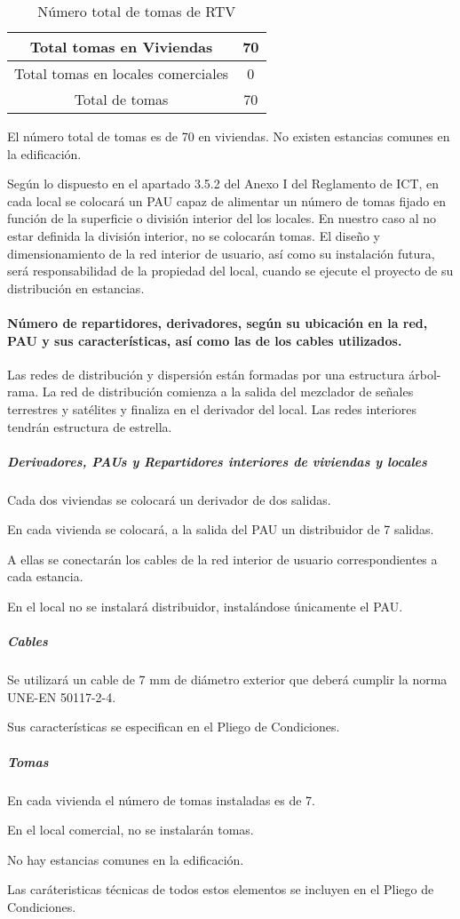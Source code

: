 \begin{table}[H]
\caption{Número total de tomas de RTV}
\label{tomasRTVtotal}
\begin{center}
\begin{tabular}{|c|c|}
\hline
    Total tomas en Viviendas & 70\\
\hline 
    Total tomas en locales comerciales & 0\\
\hline
    Total de tomas & 70	\\
\hline
\end{tabular}
\end{center}
\end{table}

El número total de tomas es de 70 en viviendas. No existen estancias comunes en la edificación.

Según lo dispuesto en el apartado 3.5.2 del Anexo I del Reglamento de ICT, en cada local se colocará un PAU capaz de alimentar un número de tomas fijado en función de la superficie o división interior del los locales. En nuestro caso al no estar definida la división interior, no se colocarán tomas. El diseño y dimensionamiento de la red interior de usuario, así como su instalación futura, será responsabilidad de la propiedad del local, cuando se ejecute el proyecto de su distribución en estancias.

\paragraph{Número de repartidores, derivadores, según su ubicación en la red, PAU y sus características, así como las de los cables utilizados.}

Las redes de distribución y dispersión están formadas por una estructura árbol-rama.
La red de distribución comienza a la salida del mezclador de señales terrestres y satélites y finaliza en el derivador del local.
Las redes interiores tendrán estructura de estrella.


\subparagraph*{Derivadores, PAUs y Repartidores interiores de viviendas y locales}

Cada dos viviendas se colocará un derivador de dos salidas.

En cada vivienda se colocará, a la salida del PAU un distribuidor de 7 salidas. 

A ellas se conectarán los cables de la red interior de usuario correspondientes a cada estancia.

En el local no se instalará distribuidor, instalándose únicamente el PAU.

\subparagraph*{Cables}

Se utilizará un cable de 7 mm de diámetro exterior que deberá cumplir la norma UNE-EN 50117-2-4.

Sus características se especifican en el Pliego de Condiciones.

\subparagraph*{Tomas}

En cada vivienda el número de tomas instaladas es de 7.

En el local comercial, no se instalarán tomas.

No hay estancias comunes en la edificación.

Las caráteristicas técnicas de todos estos elementos se incluyen en el Pliego de Condiciones.
